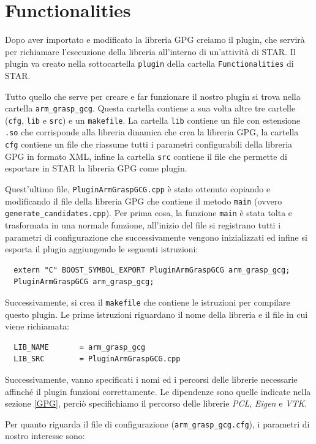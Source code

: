 \documentclass{report}
\begin{document}
\section{Functionalities}\label{fileConfig}
Dopo aver importato e modificato la libreria GPG creiamo il plugin, che servirà per richiamare l'esecuzione della libreria all'interno di un'attività di STAR. Il plugin va creato nella sottocartella \texttt{plugin} della cartella \texttt{Functionalities} di STAR. \par
Tutto quello che serve per creare e far funzionare il nostro plugin si trova nella cartella \texttt{arm\_grasp\_gcg}. Questa cartella contiene a sua volta altre tre cartelle (\texttt{cfg}, \texttt{lib} e \texttt{src}) e un \texttt{makefile}. La cartella \texttt{lib} contiene un file con estensione \texttt{.so} che corrisponde alla libreria dinamica che crea la libreria GPG, la cartella \texttt{cfg} contiene un file che riassume tutti i parametri configurabili della libreria GPG in formato XML, infine la cartella \texttt{src} contiene il file che permette di esportare in STAR la libreria GPG come plugin. \par
Quest'ultimo file, \texttt{PluginArmGraspGCG.cpp} è stato ottenuto copiando e modificando il file della libreria GPG che contiene il metodo \texttt{main} (ovvero \texttt{generate\_candidates.cpp}). Per prima cosa, la funzione \texttt{main} è stata tolta e trasformata in una normale funzione, all'inizio del file si registrano tutti i parametri di configurazione che successivamente vengono inizializzati ed infine si esporta il plugin aggiungendo le seguenti istruzioni: 
\begin{verbatim}
  extern "C" BOOST_SYMBOL_EXPORT PluginArmGraspGCG arm_grasp_gcg;
  PluginArmGraspGCG arm_grasp_gcg;
\end{verbatim}
\indent Successivamente, si crea il \texttt{makefile} che contiene le istruzioni per compilare questo plugin. Le prime istruzioni riguardano il nome della libreria e il file in cui viene richiamata:
\begin{verbatim}
  LIB_NAME       = arm_grasp_gcg
  LIB_SRC        = PluginArmGraspGCG.cpp
\end{verbatim} 
Successivamente, vanno specificati i nomi ed i percorsi delle librerie necessarie affinché il plugin funzioni correttamente. Le dipendenze sono quelle indicate nella sezione \ref{GPG}, perciò specifichiamo il percorso delle librerie \textit{PCL}, \textit{Eigen} e \textit{VTK}. \par
Per quanto riguarda il file di configurazione (\texttt{arm\_grasp\_gcg.cfg}), i parametri di nostro interesse sono:
\end{document}
